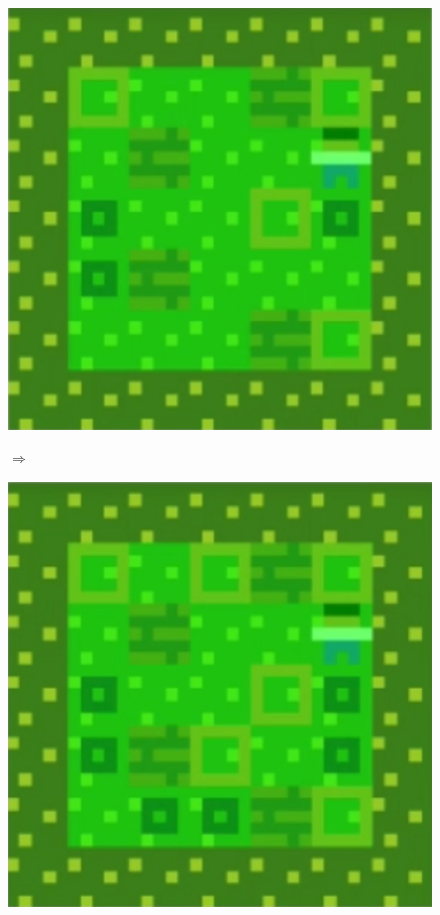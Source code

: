 \begin{figure}[!htbp]
\centering
\begin{minipage}[t]{0.25\textwidth}
\includegraphics[width=\textwidth]{figures/part5i1_cropped.png} \hfill \\
\end{minipage}
$\Longrightarrow$
\begin{minipage}[t]{0.25\textwidth}
\includegraphics[width=\textwidth]{figures/part5i2_cropped.png} \hfill \\

\end{minipage}
\end{figure}
